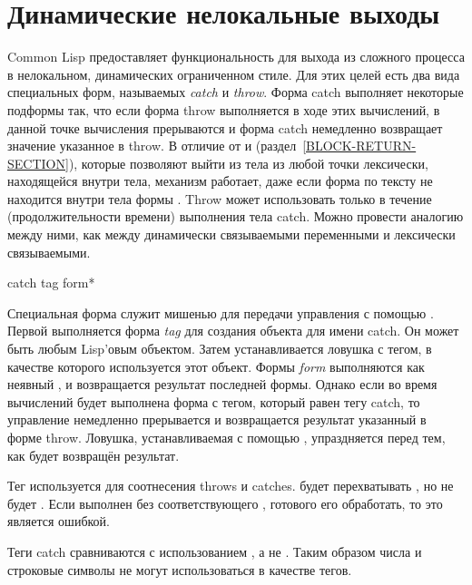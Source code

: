 \section{Динамические нелокальные выходы}
\label{CATCH-THROW-SECTION}

Common Lisp предоставляет функциональность для выхода из сложного процесса в
нелокальном, динамических ограниченном стиле. Для этих целей есть два вида
специальных форм, называемых \emph{catch} и \emph{throw}.
Форма catch выполняет некоторые подформы так, что если форма throw выполняется в
ходе этих вычислений, в данной точке вычисления прерываются и форма catch
немедленно возвращает значение указанное в throw. В отличие от  и
 (раздел~\ref{BLOCK-RETURN-SECTION}), которые позволяют выйти из
тела  из любой точки лексически, находящейся внутри тела, 
механизм работает, даже если форма  по тексту не находится внутри тела
формы .
Throw может использовать только в течение (продолжительности времени) выполнения
тела catch. Можно провести аналогию между ними, как между динамически
связываемыми переменными и лексически связываемыми.

\begin{defspec}
catch tag {form}*

Специальная форма  служит мишенью для передачи управления с помощью
.
Первой выполняется форма \emph{tag} для создания объекта для имени catch.
Он может быть любым Lisp'овым объектом.
Затем устанавливается ловушка с тегом, в качестве которого используется этот
объект.
Формы \emph{form} выполняются как неявный ,
и возвращается результат последней формы.
Однако если во время вычислений будет выполнена форма  с тегом,
который равен  тегу catch, то управление немедленно прерывается и
возвращается результат указанный в форме throw.
Ловушка, устанавливаемая с помощью , упраздняется перед тем, как
будет возвращён результат.

Тег используется для соотнесения throws и catches.
 будет перехватывать ,
но не будет . Если  выполнен без
соответствующего , готового его обработать, то это является ошибкой.

Теги catch сравниваются с использованием , а не .
Таким образом числа и строковые символы не могут использоваться в качестве
тегов.
\end{defspec}

